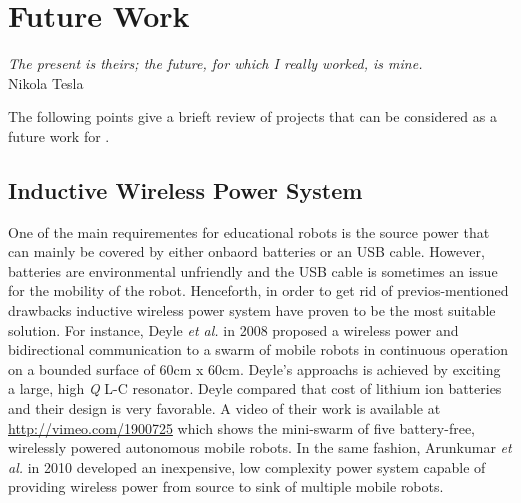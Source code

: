 
\chapter{Future Work}

\vspace{1mm}
 \footnotesize {
 \begin{flushright}
 \textit{
 The present is theirs; the future, for which I really worked, is mine.
 }\\
Nikola Tesla 
 \end{flushright}
 }
\vspace{10mm}  

The following points give a brieft review of projects that
can be considered as a future work for {\librER}.
 
\section{Inductive Wireless Power System}

One of the main requirementes for educational robots is the source power that can mainly 
be covered by either onbaord batteries or an USB cable. However, batteries are 
environmental unfriendly and the USB cable is sometimes an issue for the mobility of the 
robot. Henceforth, in order to get rid of previos-mentioned drawbacks inductive wireless 
power system have proven to be the most suitable solution.
For instance, Deyle \emph{et al.} \cite{DeyleReynolds2008} in 2008 proposed a wireless 
power and bidirectional communication to a swarm of mobile robots in continuous 
operation on a bounded surface of 60cm x 60cm. Deyle's approachs is achieved by 
exciting a large, high \textit{Q} L-C resonator. Deyle compared that cost of lithium 
ion batteries and their design is very favorable. A video of their work is available at 
\url{http://vimeo.com/1900725} which shows the mini-swarm of five battery-free, 
wirelessly powered autonomous mobile robots. In the same fashion, Arunkumar 
\emph{et al.} \cite{arunkumar2010} in 2010 developed an inexpensive, low complexity 
power system capable of providing wireless power from source to sink of 
multiple mobile robots.


